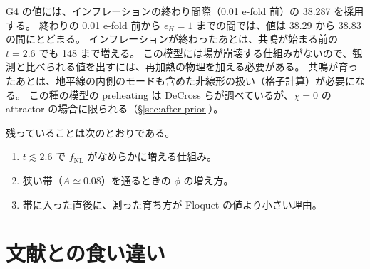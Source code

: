 \documentclass[a4paper,11pt]{ltjsarticle}
\newcommand{\fnl}{f_{\mathrm{NL}}}
\begin{document}
G4 の値には、インフレーションの終わり間際（0.01 e-fold 前）の 38.287 を採用する。
終わりの 0.01 e-fold 前から $\epsilon_H=1$ までの間では、値は 38.29 から 38.83 の間にとどまる。
インフレーションが終わったあとは、共鳴が始まる前の $t=2.6$ でも 148 まで増える。
この模型には場が崩壊する仕組みがないので、観測と比べられる値を出すには、再加熱の物理を加える必要がある。
共鳴が育ったあとは、地平線の内側のモードも含めた非線形の扱い（格子計算）が必要になる。
この種の模型の preheating は DeCross らが調べているが、$\chi=0$ の attractor の場合に限られる（\S\ref{sec:after-prior}）。

残っていることは次のとおりである。
\begin{enumerate}
\item $t\lesssim2.6$ で $\fnl$ がなめらかに増える仕組み。
\item 狭い帯（$A\simeq0.08$）を通るときの $\phi$ の増え方。
\item 帯に入った直後に、測った育ち方が Floquet の値より小さい理由。
\end{enumerate}

\section{文献との食い違い}
\label{app:discrepancies}
\end{document}
